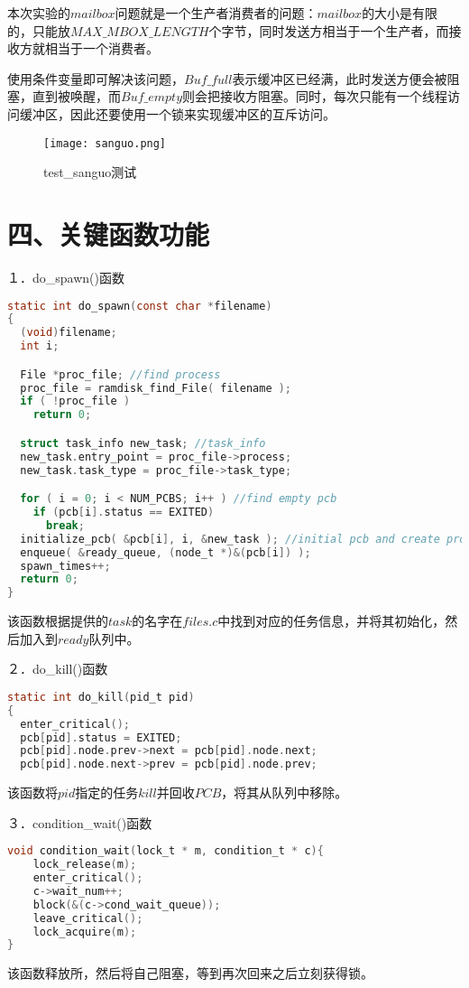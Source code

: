\documentclass[UTF8,noindent]{ctexart}
\begin{document}
本次实验的$mailbox$问题就是一个生产者消费者的问题：$mailbox$的大小是有限的，只能放$MAX\_MBOX\_LENGTH$个字节，同时发送方相当于一个生产者，而接收方就相当于一个消费者。

使用条件变量即可解决该问题，$Buf\_full$表示缓冲区已经满，此时发送方便会被阻塞，直到被唤醒，而$Buf\_empty$则会把接收方阻塞。同时，每次只能有一个线程访问缓冲区，因此还要使用一个锁来实现缓冲区的互斥访问。

\begin{figure}[H]
  \centering
  \texttt{[image: sanguo.png]}
  \caption{test\_sanguo测试}
\end{figure}
\section*{四、关键函数功能}
１．do\_spawn()函数
\begin{lstlisting}[language =c]
static int do_spawn(const char *filename)
{
  (void)filename;
  int i;

  File *proc_file; //find process
  proc_file = ramdisk_find_File( filename );
  if ( !proc_file )
	return 0;

  struct task_info new_task; //task_info
  new_task.entry_point = proc_file->process;
  new_task.task_type = proc_file->task_type;

  for ( i = 0; i < NUM_PCBS; i++ ) //find empty pcb
	if (pcb[i].status == EXITED)
	  break;
  initialize_pcb( &pcb[i], i, &new_task ); //initial pcb and create process
  enqueue( &ready_queue, (node_t *)&(pcb[i]) ); 
  spawn_times++;
  return 0;
}
\end{lstlisting}
该函数根据提供的$task$的名字在$files.c$中找到对应的任务信息，并将其初始化，然后加入到$ready$队列中。

２．do\_kill()函数
\begin{lstlisting}[language=c]
static int do_kill(pid_t pid)
{
  enter_critical();
  pcb[pid].status = EXITED;
  pcb[pid].node.prev->next = pcb[pid].node.next;
  pcb[pid].node.next->prev = pcb[pid].node.prev;
\end{lstlisting}
该函数将$pid$指定的任务$kill$并回收$PCB$，将其从队列中移除。


３．condition\_wait()函数
\begin{lstlisting}[language=c]
void condition_wait(lock_t * m, condition_t * c){
	lock_release(m);
	enter_critical();
	c->wait_num++;
	block(&(c->cond_wait_queue));
	leave_critical();
	lock_acquire(m);
}
\end{lstlisting}
该函数释放所，然后将自己阻塞，等到再次回来之后立刻获得锁。
\end{document}
